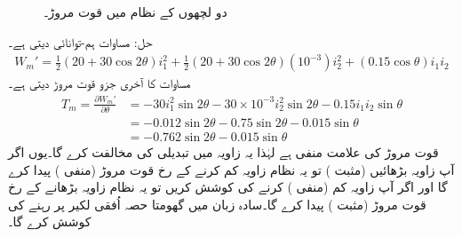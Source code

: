 \begin{figure}
\caption{دو لچھوں کے نظام میں قوت مروڑ۔}
\label{شکل_تبادلہ_توانائی_دو_لچھوں_میں_مروڑ}
\end{figure}

حل:\quad
مساوات  ہم-توانائی دیتی ہے۔
\begin{align*}
W_m'=\frac{1}{2}(20+30\cos 2\theta)i_1^2+\frac{1}{2}(20+30\cos 2\theta)(10^{-3})i_2^2+(0.15\cos\theta)i_1i_2
\end{align*}
مساوات   کا آخری جزو قوت مروڑ دیتی ہے۔
\begin{align*}
T_m=\frac{\partial W_m'}{\partial \theta}&=-30 i_1^2 \sin 2 \theta-30\times 10^{-3} i_2^2 \sin 2 \theta -0.15 i_1 i_2 \sin \theta\\
&=-0.012 \sin 2 \theta-0.75 \sin 2 \theta-0.015 \sin \theta\\
&=-0.762 \sin 2 \theta-0.015 \sin \theta
\end{align*}
قوت مروڑ کی علامت منفی ہے لہٰذا یہ زاویہ میں تبدیلی کی مخالفت کرے گا۔یوں اگر آپ زاویہ بڑھائیں (مثبت ) تو یہ نظام زاویہ کم کرنے کے رخ قوت مروڑ (منفی ) پیدا کرے گا اور اگر آپ زاویہ کم (منفی ) کرنے کی کوشش کریں تو یہ نظام  زاویہ بڑھانے کے رخ قوت مروڑ (مثبت ) پیدا کرے گا۔سادہ زبان میں گھومتا حصہ اُفقی لکیر پر رہنے کی کوشش کرے گا۔
